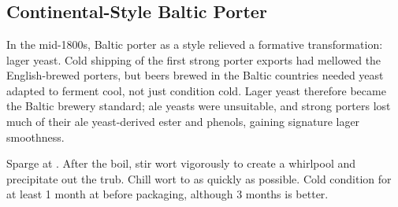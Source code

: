 \part{\stylebalticporter}

\chapter*{Continental-Style Baltic Porter}

\begin{aboutblock}
In the mid-1800s, Baltic porter as a style relieved a formative transformation:
lager yeast. Cold shipping of the first strong porter exports had mellowed the
English-brewed porters, but beers brewed in the Baltic countries needed yeast
adapted to ferment cool, not just condition cold. Lager yeast therefore became
the Baltic brewery standard; ale yeasts were unsuitable, and strong porters
lost much of their ale yeast-derived ester and phenols, gaining signature
lager smoothness.
\end{aboutblock}


\begin{methodandtiming}
 
\begin{mashsteps}
\end{mashsteps}

\begin{fermentationsteps}
\end{fermentationsteps}

\begin{directions}
Sparge at . After the boil, stir wort vigorously to create a
whirlpool and precipitate out the trub. Chill wort to  as quickly
as possible. Cold condition for at least 1 month at  before
packaging, although 3 months is better.
\end{directions}

\end{methodandtiming}

